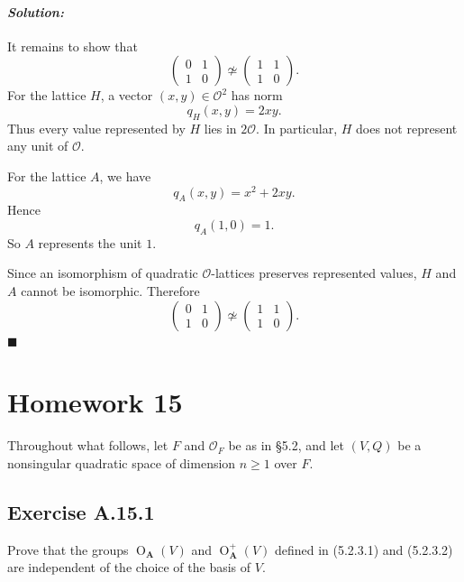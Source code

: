 \documentclass[12pt, a4paper]{article}
\newenvironment{solution}
  {\paragraph{\textit{Solution:}}\par\medskip}
  {\hfill$\blacksquare$\vspace{0.1cm}}
\begin{document}
\begin{solution}
It remains to show that
\[
\begin{pmatrix}
0&1\\
1&0
\end{pmatrix}
\not\simeq
\begin{pmatrix}
1&1\\
1&0
\end{pmatrix}.
\]
For the lattice \(H\), a vector \((x,y)\in\mathcal O^2\) has norm
\[
q_H(x,y)=2xy.
\]
Thus every value represented by \(H\) lies in \(2\mathcal O\). In particular,
\(H\) does not represent any unit of \(\mathcal O\).

For the lattice \(A\), we have
\[
q_A(x,y)=x^2+2xy.
\]
Hence
\[
q_A(1,0)=1.
\]
So \(A\) represents the unit \(1\).

Since an isomorphism of quadratic \(\mathcal O\)-lattices preserves represented
values, \(H\) and \(A\) cannot be isomorphic. Therefore
\[
\begin{pmatrix}
0&1\\
1&0
\end{pmatrix}
\not\simeq
\begin{pmatrix}
1&1\\
1&0
\end{pmatrix}.
\]
\end{solution}
\section*{Homework 15}
\noindent Throughout what follows, let $F$ and $\mathcal{O}_F$ be as in \S 5.2, and let $(V,Q)$ be a nonsingular quadratic space of dimension $n \ge 1$ over $F$.

\subsection*{Exercise A.15.1}
Prove that the groups $\operatorname{O}_{\mathbf{A}}(V)$ and $\operatorname{O}_{\mathbf{A}}^+(V)$ defined in (5.2.3.1) and (5.2.3.2) are independent of the choice of the basis of $V$.
\end{document}
